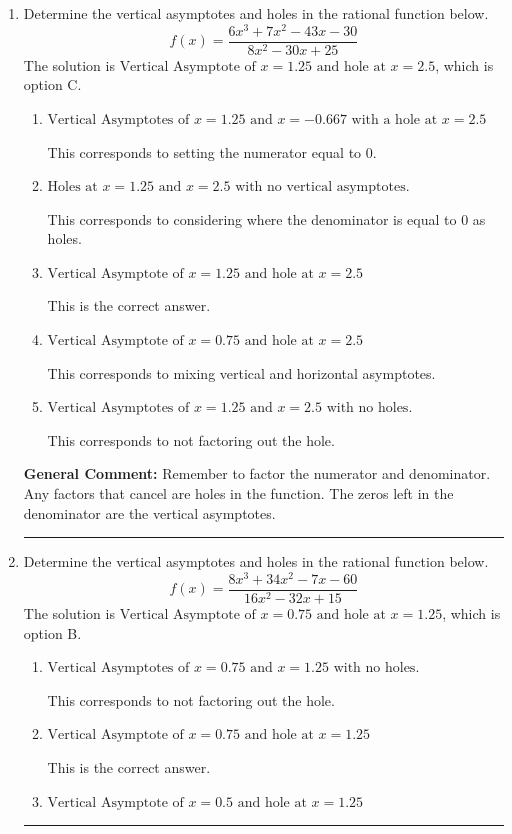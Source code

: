\documentclass{extbook}[14pt]
\newcommand{\litem}[1]{\item #1

\rule{\textwidth}{0.4pt}}
\begin{document}
\begin{enumerate}\litem{
Determine the vertical asymptotes and holes in the rational function below.
\[ f(x) = \frac{6x^{3} +7 x^{2} -43 x -30}{8x^{2} -30 x + 25} \]The solution is \( \text{Vertical Asymptote of } x = 1.25 \text{ and hole at } x = 2.5 \), which is option C.\begin{enumerate}[label=\Alph*.]
\item \( \text{Vertical Asymptotes of } x = 1.25 \text{ and } x = -0.667 \text{ with a hole at } x = 2.5 \)

This corresponds to setting the numerator equal to 0.
\item \( \text{Holes at } x = 1.25 \text{ and } x = 2.5 \text{ with no vertical asymptotes.} \)

This corresponds to considering where the denominator is equal to 0 as holes.
\item \( \text{Vertical Asymptote of } x = 1.25 \text{ and hole at } x = 2.5 \)

This is the correct answer.
\item \( \text{Vertical Asymptote of } x = 0.75 \text{ and hole at } x = 2.5 \)

This corresponds to mixing vertical and horizontal asymptotes.
\item \( \text{Vertical Asymptotes of } x = 1.25 \text{ and } x = 2.5 \text{ with no holes.} \)

This corresponds to not factoring out the hole.
\end{enumerate}

\textbf{General Comment:} Remember to factor the numerator and denominator. Any factors that cancel are holes in the function. The zeros left in the denominator are the vertical asymptotes.
}
\litem{
Determine the vertical asymptotes and holes in the rational function below.
\[ f(x) = \frac{8x^{3} +34 x^{2} -7 x -60}{16x^{2} -32 x + 15} \]The solution is \( \text{Vertical Asymptote of } x = 0.75 \text{ and hole at } x = 1.25 \), which is option B.\begin{enumerate}[label=\Alph*.]
\item \( \text{Vertical Asymptotes of } x = 0.75 \text{ and } x = 1.25 \text{ with no holes.} \)

This corresponds to not factoring out the hole.
\item \( \text{Vertical Asymptote of } x = 0.75 \text{ and hole at } x = 1.25 \)

This is the correct answer.
\item \( \text{Vertical Asymptote of } x = 0.5 \text{ and hole at } x = 1.25 \)


\end{enumerate}}
\end{enumerate}
\end{document}
